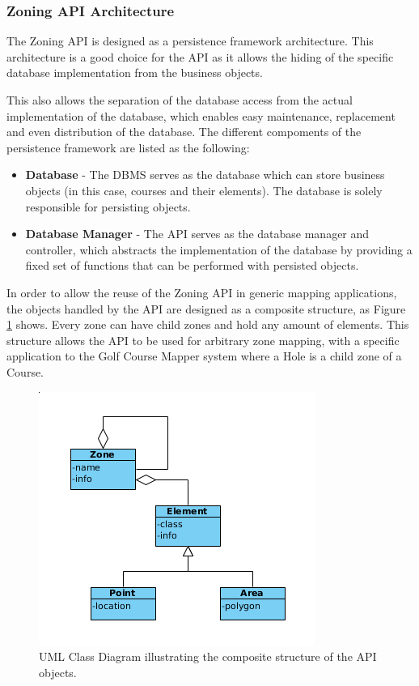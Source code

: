 \documentclass{article}
\begin{document}
    \subsubsection{Zoning API Architecture}

    The Zoning API is designed as a persistence framework architecture. This
    architecture is a good choice for the API as it allows the hiding of the
    specific database implementation from the business objects.

    This also allows the separation of the database access from the actual
    implementation of the database, which enables easy maintenance, replacement
    and even distribution of the database. The different compoments of the
    persistence framework are listed as the following:

    \begin{itemize}
        \item \textbf{Database} - The DBMS serves as the database which can
            store business objects (in this case, courses and their elements).
            The database is solely responsible for persisting objects.
        \item \textbf{Database Manager} - The API serves as the database
            manager and controller, which abstracts the implementation of the
            database by providing a fixed set of functions that can be
            performed with persisted objects.
    \end{itemize}

    In order to allow the reuse of the Zoning API in generic mapping
    applications, the objects handled by the API are designed as a composite
    structure, as Figure \ref{fig:composite} shows. Every zone can have child
    zones and hold any amount of elements. This structure allows the API to be
    used for arbitrary zone mapping, with a specific application to the Golf
    Course Mapper system where a Hole is a child zone of a Course.

    \begin{center}
        \begin{figure}[H]
            \centering
            \includegraphics[scale=0.6]{Composite}
            \caption{UML Class Diagram illustrating the composite structure of
                the API objects.}
            \label{fig:composite}
        \end{figure}
    \end{center}
\end{document}
